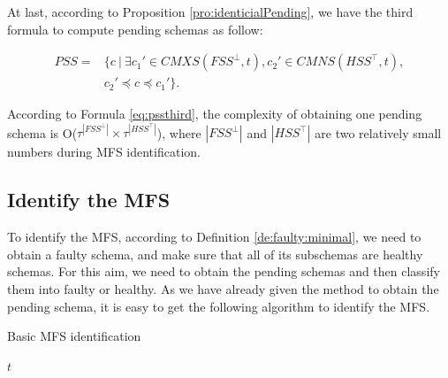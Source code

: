 \documentclass{sig-alternate-05-2015}
\begin{document}
{At last, according to Proposition \ref{pro:identicialPending}, we have the third formula to compute pending schemas as follow:

\begin{equation}\label{eq:pssthird}
\begin{aligned}
PSS = & \{ c\ |\ \exists c_{1}' \in CMXS(FSS^{\bot}, t), c_{2}' \in CMNS(HSS^{\top}, t), \\
    & c_{2}' \preceq c \preceq c_{1}' \}.
\end{aligned}
\end{equation}

According to Formula \ref{eq:pssthird}, the complexity of obtaining one pending schema is O($ \tau^{|FSS^{\bot}|} \times \tau^{|HSS^{\top}|}$), where $|FSS^{\bot}|$ and $|HSS^{\top}|$ are two relatively small numbers during MFS identification.



\subsection{Identify the MFS}
To identify the MFS, according to Definition \ref{de:faulty:minimal}, we need to obtain a faulty schema, and make sure that all of its subschemas are healthy schemas. For this aim, we need to obtain the pending schemas and then classify them into faulty or healthy. As we have already given the method to obtain the pending schema, it is easy to get the following algorithm to identify the MFS.

%
%
%
%


\begin{algorithm}[!htb]
  \caption{Basic MFS identification}
  \begin{algorithmic}[1]
     \Require  $t$ 


\end{algorithmic}
\end{algorithm}}
\end{document}
